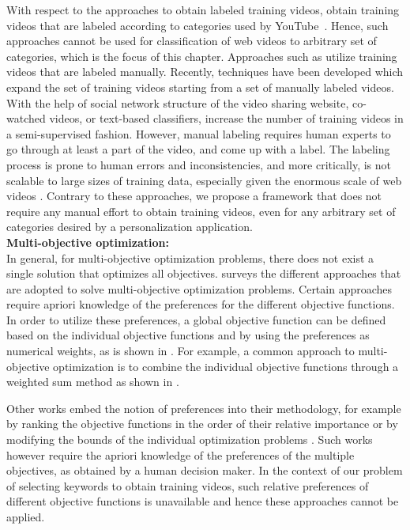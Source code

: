 With respect to the approaches to obtain labeled training videos, \cite{chen2010web,wu2010data,ramachandran2009videomule}   obtain training videos that are labeled according to categories used by YouTube~\cite{Youtube}. Hence, such approaches cannot be used for classification of web videos to arbitrary set of categories, which is the focus of this chapter. Approaches such as \cite{schindler2008internet,yang2007multi,song2010taxonomic}  utilize training videos that are labeled manually. Recently, techniques have been developed \cite{wang2010youtubecat,zhang2011improving} which expand the set of training videos starting from a set of manually labeled videos. With the help of social network structure of the video sharing website, co-watched videos, or text-based classifiers, \cite{wang2010youtubecat,zhang2011improving} increase the number of training videos in a semi-supervised fashion. However, manual labeling requires human experts to go through at least a part of the video, and come up with a label. The labeling process is prone to human errors and inconsistencies, and more critically, is not scalable to large sizes of training data, especially given the enormous scale of web videos \cite{Neilson2011}. Contrary to these approaches, we propose a framework that does not require any manual effort to obtain training videos, even for any arbitrary set of categories desired by a personalization application.\\

\noindent \textbf{Multi-objective optimization: } \\
In general, for multi-objective optimization problems, there does not exist a single solution that optimizes all objectives. \cite{Marler04} surveys the different approaches that are adopted to solve multi-objective optimization problems. Certain approaches require apriori knowledge of the preferences for the different objective functions. In order to utilize these preferences, a global objective function can be defined based on the individual objective functions and by using the preferences as numerical weights, as is shown in \cite{Papalambros96,Bridgman22,Koski87}. For example, a common approach to multi-objective optimization is to combine the individual objective functions through a weighted sum method as shown in \cite{Steuer89}. 

Other works embed the notion of preferences into their methodology, for example by ranking the objective functions in the order of their relative importance \cite{YoonHwang95,Hertz94} or by modifying the bounds of the individual optimization problems \cite{HwangMasud79,Haimes71}. Such works however require the apriori knowledge of the preferences of the multiple objectives, as obtained by a human decision maker. 
In the context of our problem of selecting keywords to obtain training videos, such relative preferences of different objective functions is unavailable and hence these approaches cannot be applied. 

